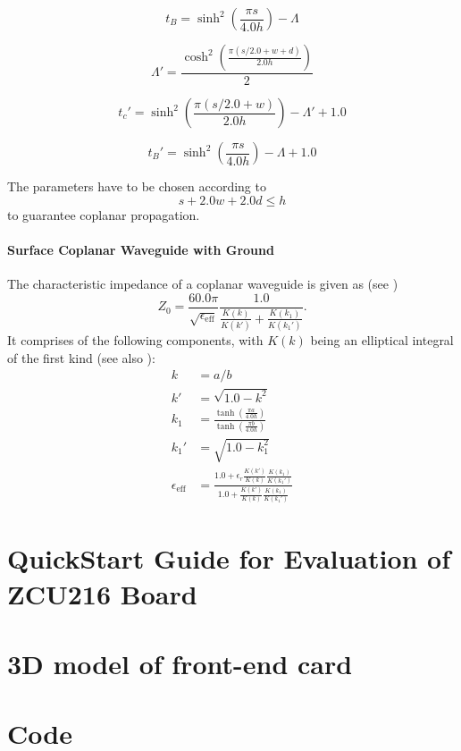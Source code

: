 \begin{equation}
	t_B = \sinh^2 \left( \frac{\pi s}{4.0 h} \right) - \Lambda
\end{equation}


\begin{equation}
	\Lambda' = \frac{\cosh^2 \left( \frac{\pi (s/2.0 + w + d)}{2.0 h} \right) }{2}
\end{equation}

\begin{equation}
	t_c' = \sinh^2 \left( \frac{\pi (s/2.0 + w)}{2.0 h} \right) - \Lambda' + 1.0
\end{equation}

\begin{equation}
	t_B' = \sinh^2 \left( \frac{\pi s}{4.0 h} \right) - \Lambda + 1.0
\end{equation}

The parameters have to be chosen according to 
\begin{equation}
	s + 2.0 w + 2.0 d \leq h
\end{equation}
to guarantee coplanar propagation. \cite{wadell}


\paragraph{Surface Coplanar Waveguide with Ground}  
The characteristic impedance of a coplanar waveguide is given as (see \cite{wadell}) 
\begin{equation}
	Z_0 = \frac{60.0 \pi}{\sqrt{\epsilon_\text{eff}}} \frac{1.0}{\frac{K(k)}{K(k')} + \frac{K(k_1)}{K(k_1')}}.
\end{equation}
It comprises of the following components, with $K(k)$ being an elliptical integral of the first kind (see also \cite[p.~430]{bronstein}):
\begin{align}
	k &= a/b\\
	k' &= \sqrt{1.0 - k^{2}}\\
	k_1 &= \frac{\tanh(\frac{\pi a}{4.0  h})}{\tanh(\frac{\pi  b}{4.0 h})}\\
	k_1' &= \sqrt{1.0 - k_1^{2}}\\
	\epsilon_\text{eff} &= \frac{1.0 + \epsilon_r \frac{K(k')}{K(k)} \frac{K(k_1)}{K(k_1')}}{1.0 + \frac{K(k')}{K(k)} \frac{K(k_1)}{K(k_1')}}
\end{align}



\section{QuickStart Guide for Evaluation of ZCU216 Board}
\section{3D model of front-end card}
\section{Code}

